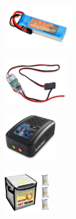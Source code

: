 \documentclass[../Head/report.tex]{subfiles}
\begin{document}
\begin{figure}[H]
    \centering
    \hspace{-1.0em}
    \begin{subfigure}[b]{.25\textwidth}
        \centering
        \includegraphics[height=2.0cm]{../Figures/batteries/lipo_one.png}
        \caption{}
        \label{fig:gens_ace_lipo_battery}
    \end{subfigure}
    \begin{subfigure}[b]{.20\textwidth}
        \centering
        \includegraphics[height=2.0cm]{../Figures/batteries/ubec_3A_power_converter.png}
        \caption{}
        \label{fig:ubec_3A_power_converter}
    \end{subfigure}
        \begin{subfigure}[b]{.20\textwidth}
        \centering
        \includegraphics[height=2.0cm]{../Figures/batteries/balance_charger_sky_rc.jpg}
        \caption{}
        \label{fig:balance_charger_sky_rc}
    \end{subfigure}
            \begin{subfigure}[b]{.25\textwidth}
        \centering
        \includegraphics[height=2cm]{../Figures/batteries/lipo_battery_case.jpg}
        \caption{}
        \label{fig:lipo_battery_case}
    \end{subfigure}

\end{figure}
\end{document}
